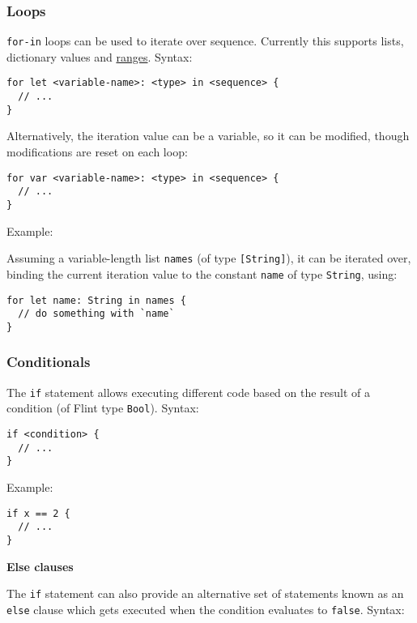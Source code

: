 \subsubsection{Loops}
\label{sec:appendix-b-loops}

\texttt{for-in} loops can be used to iterate over sequence. Currently this supports lists, dictionary values and \hyperref[sec:appendix-b-range-types]{ranges}. Syntax:

\begin{verbatim}
for let <variable-name>: <type> in <sequence> {
  // ...
}
\end{verbatim}

Alternatively, the iteration value can be a variable, so it can be modified, though modifications are reset on each loop:

\begin{verbatim}
for var <variable-name>: <type> in <sequence> {
  // ...
}
\end{verbatim}

Example:

Assuming a variable-length list \texttt{names} (of type \texttt{[String]}), it can be iterated over, binding the current iteration value to the constant \texttt{name} of type \texttt{String}, using:

\begin{verbatim}
for let name: String in names {
  // do something with `name`
}
\end{verbatim}

\subsubsection{Conditionals}
\label{sec:appendix-b-conditionals}

The \texttt{if} statement allows executing different code based on the result of a condition (of Flint type \texttt{Bool}). Syntax:

\begin{verbatim}
if <condition> {
  // ...
}
\end{verbatim}

Example:

\begin{verbatim}
if x == 2 {
  // ...
}
\end{verbatim}

\textbf{Else clauses}
\label{sec:appendix-b-else-clauses}

The \texttt{if} statement can also provide an alternative set of statements known as an \texttt{else} clause which gets executed when the condition evaluates to \texttt{false}. Syntax:

